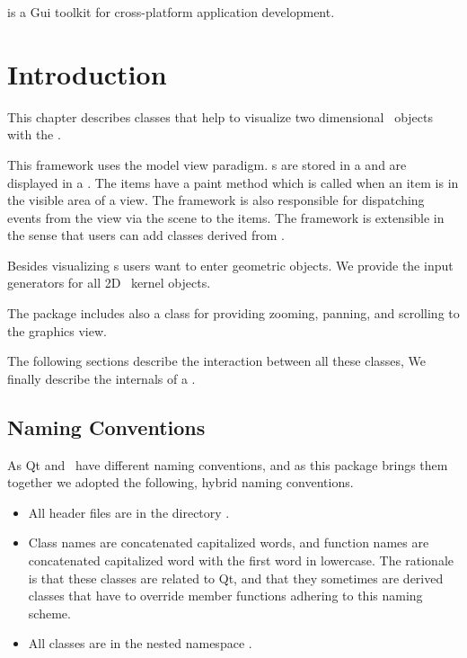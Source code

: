 

 is a
{\sc Gui} toolkit for
cross-platform application development.

\section{Introduction}

This chapter describes classes that help to visualize two dimensional \cgal\ objects
with the .

This framework uses the model view paradigm. s are stored in a 
and are displayed in a . The items 
have a paint method which is called when an item is in the visible area of a view.
The framework is also responsible for dispatching events from the view
via the scene to the items. The framework is extensible in the sense
that users can add classes derived from .

Besides visualizing s users want to enter geometric objects.
We provide the input generators for all 2D \cgal\ kernel objects.

The package includes also a class for providing zooming, panning, and scrolling
to the graphics view.


The following sections describe the interaction between all these classes,
We finally describe the internals of a .

\subsection{Naming Conventions}

As Qt and \cgal\ have different naming conventions, and as this package
brings them together we adopted the following, hybrid naming conventions.

\begin{itemize}
\item All header files are in the directory . 
\item Class names are concatenated capitalized words, and function names are
      concatenated capitalized word with the first word in lowercase. The rationale is that
      these classes are related to Qt, and that they sometimes are derived
      classes that have to override member functions adhering to this naming scheme.
\item All classes are in the nested namespace .
\end{itemize}
 



